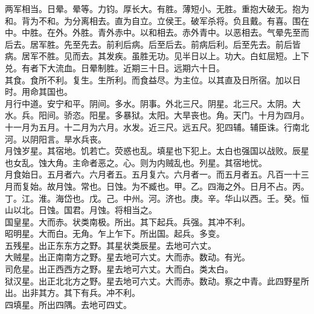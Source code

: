 \documentclass{zhvt-classic}
\begin{document}
\hspace*{2em}两军相当。日晕。晕等。力钧。厚长大。有胜。薄短小。无胜。重抱大破无。抱为和。背为不和。为分离相去。直为自立。立侯王。破军杀将。负且戴。有喜。围在中。中胜。在外。外胜。青外赤中。以和相去。赤外青中。以恶相去。气晕先至而后去。居军胜。先至先去。前利后病。后至后去。前病后利。后至先去。前后皆病。居军不胜。见而去。其发疾。虽胜无功。见半日以上。功大。白虹屈短。上下兑。有者下大流血。日晕制胜。近期三十日。远期六十日。\\
\hspace*{2em}其食。食所不利。复生。生所利。而食益尽。为主位。以其直及日所宿。加以日时。用命其国也。\\
\hspace*{2em}月行中道。安宁和平。阴间。多水。阴事。外北三尺。阴星。北三尺。太阴。大水。兵。阳间。骄恣。阳星。多暴狱。太阳。大旱丧也。角。天门。十月为四月。十一月为五月。十二月为六月。水发。近三尺。远五尺。犯四辅。辅臣诛。行南北河。以阴阳言。旱水兵丧。\\
\hspace*{2em}月蚀岁星。其宿地。饥若亡。荧惑也乱。填星也下犯上。太白也强国以战败。辰星也女乱。蚀大角。主命者恶之。心。则为内贼乱也。列星。其宿地忧。\\
\hspace*{2em}月食始日。五月者六。六月者五。五月复六。六月者一。而五月者五。凡百一十三月而复始。故月蚀。常也。日蚀。为不臧也。甲。乙。四海之外。日月不占。丙。丁。江。淮。海岱也。戊。己。中州。河。济也。庚。辛。华山以西。壬。癸。恒山以北。日蚀。国君。月蚀。将相当之。\\
\hspace*{2em}国皇星。大而赤。状类南极。所出。其下起兵。兵强。其冲不利。\\
\hspace*{2em}昭明星。大而白。无角。乍上乍下。所出国。起兵。多变。\\
\hspace*{2em}五残星。出正东东方之野。其星状类辰星。去地可六丈。\\
\hspace*{2em}大贼星。出正南南方之野。星去地可六丈。大而赤。数动。有光。\\
\hspace*{2em}司危星。出正西西方之野。星去地可六丈。大而白。类太白。\\
\hspace*{2em}狱汉星。出正北北方之野。星去地可六丈。大而赤。数动。察之中青。此四野星所出。出非其方。其下有兵。冲不利。\\
\hspace*{2em}四填星。所出四隅。去地可四丈。\\
\end{document}
